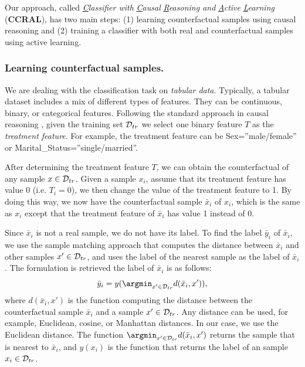 Our approach, called \textit{\uline{C}}\textit{lassifier with }\textit{\uline{C}}\textit{ausal
}\textit{\uline{R}}\textit{easoning and }\textit{\uline{A}}\textit{ctive
}\textit{\uline{L}}\textit{earning} (\textbf{CCRAL}), has two main
steps: (1) learning counterfactual samples using causal reasoning
and (2) training a classifier with both real and counterfactual samples
using active learning.

\subsubsection{Learning counterfactual samples.\label{subsec:Learning-counterfactual-samples.}}

We are dealing with the classification task on \textit{tabular data}.
Typically, a tabular dataset includes a mix of different types of
features. They can be continuous, binary, or categorical features.
Following the standard approach in causal reasoning \cite{wang2015visual},
given the training set ${\cal D}_{tr}$ we select one binary feature
$T$ as the \textit{treatment feature}. For example, the treatment
feature can be Sex=''male/female'' or Marital\_Status=''single/married''.

After determining the treatment feature $T$, we can obtain the counterfactual
of any sample $x\in{\cal D}_{tr}$. Given a sample $x_{i}$, assume
that its treatment feature has value $0$ (i.e. $T_{i}=0$), we then
change the value of the treatment feature to 1. By doing this way,
we now have the counterfactual sample $\bar{x}_{i}$ of $x_{i}$,
which is the same as $x_{i}$ except that the treatment feature of
$\bar{x}_{i}$ has value 1 instead of 0.

Since $\bar{x}_{i}$ is not a real sample, we do not have its label.
To find the label $\bar{y}_{i}$ of $\bar{x}_{i}$, we use the sample
matching approach that computes the distance between $\bar{x}_{i}$
and other samples $x'\in{\cal D}_{tr}$, and uses the label of the
nearest sample as the label of $\bar{x}_{i}$ \cite{bottou2013counterfactual}.
The formulation is retrieved the label of $\bar{x}_{i}$ is as follows:
\begin{equation}
\bar{y}_{i}=y(\argmin_{x'\in{\cal D}_{tr}}d(\bar{x}_{i},x')),\label{eq:distance}
\end{equation}
where $d(\bar{x}_{i},x')$ is the function computing the distance
between the counterfactual sample $\bar{x}_{i}$ and a sample $x'\in{\cal D}_{tr}$.
Any distance can be used, for example, Euclidean, cosine, or Manhattan
distances. In our case, we use the Euclidean distance. The function
$\argmin_{x'\in{\cal D}_{tr}}d(\bar{x}_{i},x')$ returns the sample
that is nearest to $\bar{x}_{i}$, and $y(x_{i})$ is the function
that returns the label of an sample $x_{i}\in{\cal D}_{tr}$.

